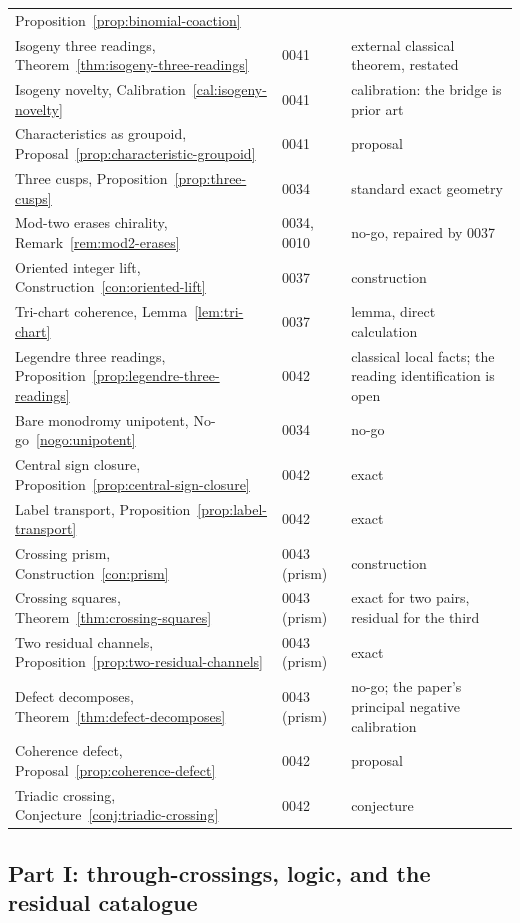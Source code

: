 \begin{longtable}{@{}p{}p{}p{}@{}}
  Proposition~\ref{prop:binomial-coaction} \\
Isogeny three readings, Theorem~\ref{thm:isogeny-three-readings} & 0041 & external classical
  theorem, restated \\
Isogeny novelty, Calibration~\ref{cal:isogeny-novelty} & 0041 & calibration: the bridge is
  prior art \\
Characteristics as groupoid, Proposal~\ref{prop:characteristic-groupoid} & 0041 & proposal \\
Three cusps, Proposition~\ref{prop:three-cusps} & 0034 & standard exact geometry \\
Mod-two erases chirality, Remark~\ref{rem:mod2-erases} & 0034, 0010 & no-go, repaired by
  0037 \\
Oriented integer lift, Construction~\ref{con:oriented-lift} & 0037 & construction \\
Tri-chart coherence, Lemma~\ref{lem:tri-chart} & 0037 & lemma, direct calculation \\
Legendre three readings, Proposition~\ref{prop:legendre-three-readings} & 0042 & classical
  local facts; the reading identification is open \\
Bare monodromy unipotent, No-go~\ref{nogo:unipotent} & 0034 & no-go \\
Central sign closure, Proposition~\ref{prop:central-sign-closure} & 0042 & exact \\
Label transport, Proposition~\ref{prop:label-transport} & 0042 & exact \\
Crossing prism, Construction~\ref{con:prism} & 0043 (prism) & construction \\
Crossing squares, Theorem~\ref{thm:crossing-squares} & 0043 (prism) & exact for two pairs,
  residual for the third \\
Two residual channels, Proposition~\ref{prop:two-residual-channels} & 0043 (prism) & exact \\
Defect decomposes, Theorem~\ref{thm:defect-decomposes} & 0043 (prism) & no-go; the paper's
  principal negative calibration \\
Coherence defect, Proposal~\ref{prop:coherence-defect} & 0042 & proposal \\
Triadic crossing, Conjecture~\ref{conj:triadic-crossing} & 0042 & conjecture \\
\bottomrule
\end{longtable}

\subsection{Part I: through-crossings, logic, and the residual catalogue}

